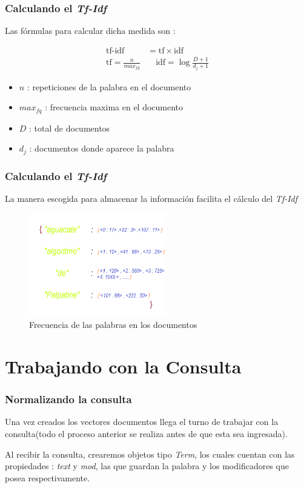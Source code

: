 \documentclass{beamer}
\begin{document}
\begin{frame}
    \frametitle{Calculando el \textit{Tf-Idf}}
    Las fórmulas para calcular dicha medida son : 

    \begin{align*}
        \text{tf-idf} &= \text{tf} \times \text{idf} \\
        \text{tf} = \frac{n}{max_{fq}} &\quad \text{idf} = \log\frac{D + 1}{d_j + 1}
    \end{align*}

    \begin{itemize}
        \item $n$ : repeticiones de la palabra en el documento
        \item $max_{fq}$ : frecuencia maxima en el documento
        \item $D$ : total de documentos
        \item $d_j$ : documentos donde aparece la palabra
    \end{itemize}
    

\end{frame}

\begin{frame}
    \frametitle{Calculando el \textit{Tf-Idf}}
    La manera escogida para almacenar la información facilita el cálculo del \textit{Tf-Idf}
    \begin{figure}
        \includegraphics[width = 6cm]{./../images/content.png}
        \caption{Frecuencia de las palabras en los documentos}
    
    \end{figure}
\end{frame}

\section{Trabajando con la Consulta}

\begin{frame}
    \frametitle{Normalizando la consulta}

    Una vez creados los vectores documentos llega el turno de trabajar con la consulta(todo el proceso anterior se 
    realiza antes de que esta sea ingresada).

    Al recibir la consulta, crearemos objetos tipo \textit{Term}, los cuales cuentan con las propiedades : \textit{text} y
    \textit{mod}, las que guardan la palabra y los modificadores que posea respectivamente.
\end{frame}
\end{document}
